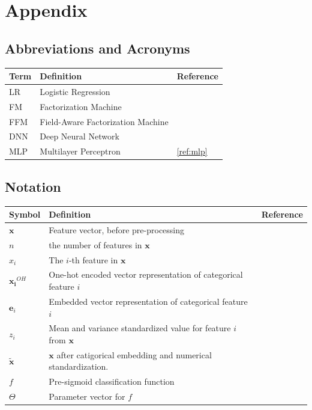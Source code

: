 \documentclass{mldsmsc}
\begin{document}
\clearpage
\renewcommand*{\thepage}{A\arabic{page}}

\appendix
%
\chapter{Appendix}

\section{Abbreviations and Acronyms}
\label{app:acronyms}

\begin{table}[ht]
    \begin{tabular}{|l|l|l|}
      \hline
        \textbf{Term} & \textbf{Definition} & \textbf{Reference} \\
      \hline
        LR& Logistic Regression & \\
        FM & Factorization Machine & \\
        FFM & Field-Aware Factorization Machine & \\
        DNN & Deep Neural Network & \\
        MLP & Multilayer Perceptron & \ref{ref:mlp} \\
    \hline
    \end{tabular}
\end{table}


\section{Notation}
\label{app:notation}

\begin{table}[ht]
    \begin{tabular}{|l|l|l|}
      \hline
        \textbf{Symbol} & \textbf{Definition} & \textbf{Reference} \\
      \hline
        $\mathbf{x}$& Feature vector, before pre-processing &\\
        $n$ & the number of features in $\mathbf{x}$ &\\
        $x_i$& The $i$-th feature in $\mathbf{x}$ &\\
        $\mathbf{x_i}^{OH}$ & One-hot encoded vector representation of categorical feature $i$ &\\
        $\mathbf{e}_i$ & Embedded vector representation of categorical feature $i$ & \\
        $z_i$ & Mean and variance standardized value for feature $i$ from $\mathbf{x}$ &\\
        $\tilde{\mathbf{x}}$ & $\mathbf{x}$ after catigorical embedding and numerical standardization. &\\
        $f$ & Pre-sigmoid classification function &\\
        $\Theta$ & Parameter vector for $f$ & \\
    \hline
    \end{tabular}
\end{table}
\end{document}
